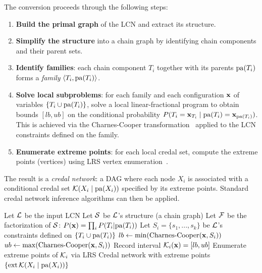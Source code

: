 \documentclass{article}
\begin{document}
The conversion proceeds through the following steps:
\begin{enumerate}
    \item \textbf{Build the primal graph} of the LCN and extract its structure.
    \item \textbf{Simplify the structure} into a chain graph by identifying chain components and their parent sets.
    \item \textbf{Identify families}: each chain component $T_i$ together with its parents $\mathrm{pa}(T_i)$ forms a \emph{family} $\langle T_i, \mathrm{pa}(T_i) \rangle$.
    \item \textbf{Solve local subproblems}: for each family and each configuration $\mathbf{x}$ of variables $\{T_i \cup \mathrm{pa}(T_i)\}$, solve a local linear-fractional program to obtain bounds $[lb, ub]$ on the conditional probability $P(T_i = \mathbf{x}_{T_i} \mid \mathrm{pa}(T_i) = \mathbf{x}_{\mathrm{pa}(T_i)})$. This is achieved via the Charnes-Cooper transformation~\cite{charnes1962programming} applied to the LCN constraints defined on the family.
    \item \textbf{Enumerate extreme points}: for each local credal set, compute the extreme points (vertices) using LRS vertex enumeration~\cite{avis1992pivoting}.
\end{enumerate}

The result is a \emph{credal network}: a DAG where each node $X_i$ is associated with a conditional credal set $\mathcal{K}(X_i \mid \mathrm{pa}(X_i))$ specified by its extreme points. Standard credal network inference algorithms can then be applied.

\begin{algorithm}[t]
  \caption{LCN to Credal Network}
  \label{alg:lcn2credal}
    \begin{algorithmic}[1]
    \State Let $\mathcal{L}$ be the input LCN
    \State Let $\mathcal{S}$ be $\mathcal{L}$'s structure (a chain graph)
    \State Let $\mathcal{F}$ be the factorization of $\mathcal{S}$: $P(\mathbf{x}) = \prod_i P(T_i | \mathrm{pa}(T_i))$
            \State Let $S_i = \{s_1, ..., s_k\}$ be $\mathcal{L}$'s constraints defined on $\{T_i \cup \mathrm{pa}(T_i)\}$
            \State $lb \leftarrow \min(\text{Charnes-Cooper}(\mathbf{x}, S_i))$
            \State $ub \leftarrow \max(\text{Charnes-Cooper}(\mathbf{x}, S_i))$
            \State Record interval $\mathcal{K}_i(\mathbf{x}) = [lb, ub]$
        \EndFor
        \State Enumerate extreme points of $\mathcal{K}_i$ via LRS
    \EndFor
    \State \Return Credal network with extreme points $\{\mathrm{ext}\,\mathcal{K}(X_i \mid \mathrm{pa}(X_i))\}$
    \end{algorithmic}
\end{algorithm}
\end{document}
